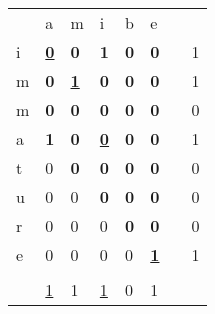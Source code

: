 \documentclass{KodeBook}
\begin{document}
\begin{figure}[ht]
	
\begin{minipage}{0.45\textwidth}

\begin{tabular}{|l|l|l|l|l|l|l|l|}
	\cline{1-6}
	  & a & m & i & b & e & \multicolumn{2}{l}{ }\\
	\cline{1-6}\cline{8-8}
	i & \underline{\textbf{0}} & \textbf{0} & \textbf{1} & \textbf{0} & \textbf{0} & & 1\\
	\cline{1-6}\cline{8-8}
	m & \textbf{0} & \underline{\textbf{1}} & \textbf{0} & \textbf{0} & \textbf{0} & & 1\\
	\cline{1-6}\cline{8-8}
	m & \textbf{0} & \textbf{0} & \textbf{0} & \textbf{0} & \textbf{0} & & 0\\
	\cline{1-6}\cline{8-8}
	a & \textbf{1} & \textbf{0} & \underline{\textbf{0}} & \textbf{0} & \textbf{0} & & 1\\
	\cline{1-6}\cline{8-8}
	t & 0 & \textbf{0} & \textbf{0} & \textbf{0} & \textbf{0} & & 0\\
	\cline{1-6}\cline{8-8}
	u & 0 & 0 & \textbf{0} & \textbf{0} & \textbf{0} & & 0\\
	\cline{1-6}\cline{8-8}
	r & 0 & 0 & 0 & \textbf{0} & \textbf{0} & & 0\\
	\cline{1-6}\cline{8-8}
	e & 0 & 0 & 0 & 0 & \underline{\textbf{1}} & & 1\\
	\cline{1-6}\cline{8-8}
	\multicolumn{8}{l}{ }\\
	\cline{2-6}
	 \multicolumn{1}{l|}{} & \underline{1} & 1 & \underline{1} & 0 & 1 & \multicolumn{2}{l}{ }\\
	\cline{2-6}
\end{tabular}

\end{minipage}
\begin{minipage}{0.45\textwidth}


\end{minipage}
\end{figure}
\end{document}
